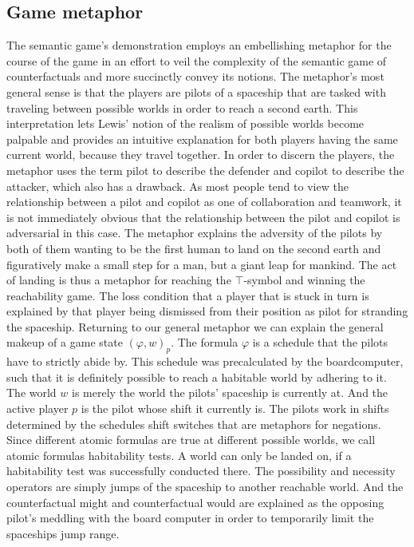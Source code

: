\documentclass[a4paper,american,10pt]{paper}
\theoremstyle{definition}\newtheorem{definition}{Definition}
\begin{document}
\subsection{Game metaphor}
The semantic game's demonstration employs an embellishing metaphor for the course of the game in an effort to veil the complexity of the semantic game of counterfactuals and more succinctly convey its notions. The metaphor's most general sense is that the players are pilots of a spaceship that are tasked with traveling between possible worlds in order to reach a second earth. This interpretation lets Lewis' notion of the realism of possible worlds become palpable and provides an intuitive explanation for both players having the same current world, because they travel together. In order to discern the players, the metaphor uses the term pilot to describe the defender and copilot to describe the attacker, which also has a drawback. As most people tend to view the relationship between a pilot and copilot as one of collaboration and teamwork, it is not immediately obvious that the relationship between the pilot and copilot is adversarial in this case. The metaphor explains the adversity of the pilots by both of them wanting to be the first human to land on the second earth and figuratively make a small step for a man, but a giant leap for mankind. The act of landing is thus a metaphor for reaching the $\top$-symbol and winning the reachability game. The loss condition that a player that is stuck in turn is explained by that player being dismissed from their position as pilot for stranding the spaceship. Returning to our general metaphor we can explain the general makeup of a game state $(\varphi, w)_p$. The formula $\varphi$ is a schedule that the pilots have to strictly abide by. This schedule was precalculated by the boardcomputer, such that it is definitely possible to reach a habitable world by adhering to it. The world $w$ is merely the world the pilots' spaceship is currently at. And the active player $p$ is the pilot whose shift it currently is. The pilots work in shifts determined by the schedules shift switches that are metaphors for negations. Since different atomic formulas are true at different possible worlds, we call atomic formulas habitability tests. A world can only be landed on, if a habitability test was successfully conducted there. The possibility and necessity operators are simply jumps of the spaceship to another reachable world. And the counterfactual might and counterfactual would are explained as the opposing pilot's meddling with the board computer in order to temporarily limit the spaceships jump range.
\end{document}
